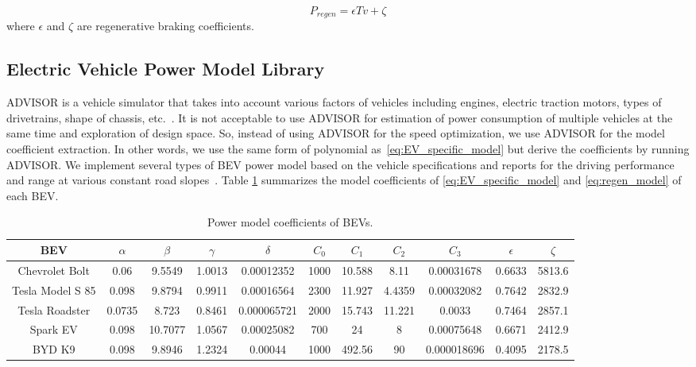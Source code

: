 \documentclass{IEEEtran}
\begin{document}
\begin{equation}\label{eq:regen_model} 
P_{regen} = \epsilon T v + \zeta
\end{equation}  %
where $\epsilon$ and $\zeta$ are regenerative braking coefficients.

\subsection{Electric Vehicle Power Model Library}

ADVISOR is a vehicle simulator that takes into account various factors of vehicles including engines, electric traction motors, types of drivetrains, shape of chassis, etc.~\cite{Markel:JPS02}. 
It is not acceptable to use ADVISOR for estimation of power consumption of multiple vehicles at the same time and exploration of design space. 
So, instead of using ADVISOR for the speed optimization, we use ADVISOR for the model coefficient extraction. 
In other words, we use the same form of polynomial as~\eqref{eq:EV_specific_model} but derive the coefficients by running ADVISOR.
We implement several types of BEV power model based on the vehicle specifications and reports for the driving performance and range at various constant road slopes~\cite{GM_Bolt:official,Tesla_ModelS:official,GM_Spark:official,BYD_K9:official,Tesla_Roadster:official}. 
Table \ref{table:Coeff_EVs} summarizes the model coefficients of \eqref{eq:EV_specific_model} and \eqref{eq:regen_model} of each BEV. 

\begin{table} 	%
\centering
\small
\caption{Power model coefficients of BEVs.}
\label{table:Coeff_EVs}
\begin{tabular}{|c|c|c|c|c|c|c|c|c|c|c|} \hline

BEV 		 	&$\alpha$	&$\beta$	&$\gamma$	&$\delta$		&$C_0$	&$C_1$	&$C_2$	&$C_3$		&$\epsilon$	&$\zeta$ \\ \hline

Chevrolet Bolt	&0.06	&9.5549	&1.0013		&0.00012352	&1000	&10.588	&8.11	&0.00031678	&0.6633		&5813.6 \\ \hline

Tesla Model S 85 &0.098	&9.8794	&0.9911		&0.00016564	&2300	&11.927	&4.4359	&0.00032082	& 0.7642		&2832.9 \\ \hline

Tesla Roadster	&0.0735	&8.723	&0.8461		&0.000065721	&2000	&15.743	&11.221	&0.0033		&0.7464		&2857.1 \\ \hline

Spark EV		&0.098	&10.7077	&1.0567		&0.00025082	&700		&24		&8	&0.00075648	&0.6671		&2412.9 \\ \hline

BYD K9		&0.098	&9.8946	&1.2324		&0.00044		&1000	&492.56	&90	&0.000018696	&0.4095		&2178.5 \\ \hline

\end{tabular}
\end{table}
\end{document}
